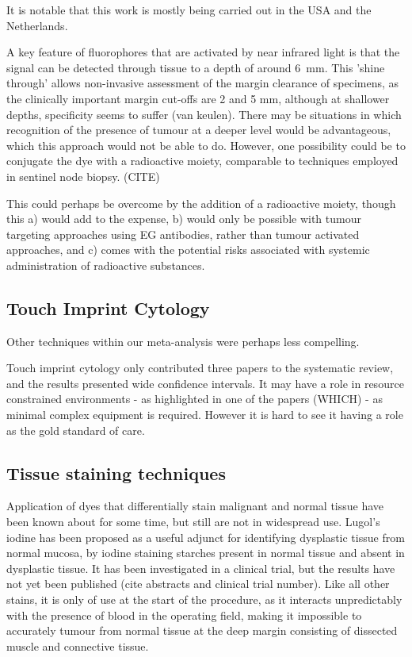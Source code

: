 It is notable that this work is mostly being carried out in the USA and the Netherlands.

A key feature of fluorophores that are activated by near infrared light is that the signal can be detected through tissue to a depth of around \SI{6}{\milli\meter}.
This 'shine through' allows non-invasive assessment of the margin clearance of specimens, as the clinically important margin cut-offs are 2 and 5 mm, although at shallower depths, specificity seems to suffer (van keulen).
There may be situations in which recognition of the presence of tumour at a deeper level would be advantageous, which this approach would not be able to do.
However, one possibility could be to conjugate the dye with a radioactive moiety, comparable to techniques employed in sentinel node biopsy. (CITE)

This could perhaps be overcome by the addition of a radioactive moiety, though this a) would add to the expense, b) would only be possible with tumour targeting approaches using EG antibodies, rather than tumour activated approaches, and c) comes with the potential risks associated with systemic administration of radioactive substances.

\subsection{Touch Imprint Cytology}

Other techniques within our meta-analysis were perhaps less compelling.

Touch imprint cytology only contributed three papers to the systematic review, and the results presented wide confidence intervals. 
It may have a role in resource constrained environments - as highlighted in one of the papers (WHICH) - as minimal complex equipment is required. 
However it is hard to see it having a role as the gold standard of care.

\subsection{Tissue staining techniques}

Application of dyes that differentially stain malignant and normal tissue have been known about for some time, but still are not in widespread use.
Lugol's iodine has been proposed as a useful adjunct for identifying dysplastic tissue from normal mucosa, by iodine staining starches present in normal tissue and absent in dysplastic tissue.
It has been investigated in a clinical trial, but the results have not yet been published (cite abstracts and clinical trial number).
Like all other stains, it is only of use at the start of the procedure, as it interacts unpredictably with the presence of blood in the operating field, making it impossible to accurately tumour from normal tissue at the deep margin consisting of dissected muscle and connective tissue.

